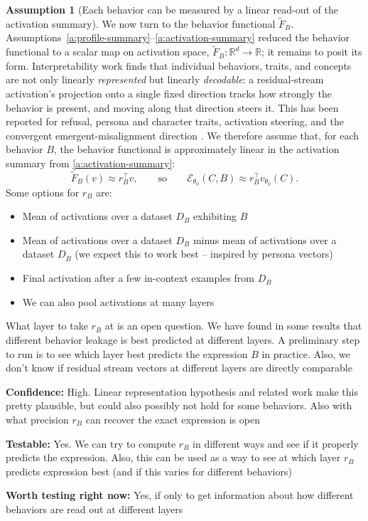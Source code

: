 \documentclass[11pt]{article}
\theoremstyle{definition}
\theoremstyle{definition}
\theoremstyle{assumptionstyle}
\newtheorem{assumption}{Assumption}[section]
\newcommand{\Expr}{\mathcal{E}}        %
\newcommand{\R}{\mathbb{R}}
\begin{document}
\begin{assumption}[Each behavior can be measured by a linear read-out of the activation summary]
\label{a:linear-readout}
We now turn to the behavior functional $\widetilde F_B$.
Assumptions~\ref{a:profile-summary}--\ref{a:activation-summary} reduced the
behavior functional to a scalar map on activation space,
\(\widetilde F_B:\R^d\to\R\); it remains to posit its form. Interpretability work
finds that individual behaviors, traits, and concepts are not only linearly
\emph{represented} but linearly \emph{decodable}: a residual-stream activation's
projection onto a single fixed direction tracks how strongly the behavior is
present, and moving along that direction steers it. This has been reported for
refusal, persona and character traits, activation steering,
and the convergent emergent-misalignment direction
\cite{arditi2024,chen2025,wang2025,turner2023,panickssery2023,zou2023,soligo2025,park2023}.
We therefore assume that, for each behavior \(B\), the behavior functional is approximately linear in the activation summary from \ref{a:activation-summary}:
\[
\widetilde F_B(v)
\approx
r_B^\top v,
\qquad\text{so}\qquad
\Expr_{\theta_0}(C,B)
\approx
r_B^\top v_{\theta_0}(C).
\]
Some options for $r_B$ are:
\begin{itemize}
    \item Mean of activations over a dataset $D_{B}$ exhibiting $B$
    \item Mean of activations over a dataset $D_{B}$ minus mean of activations over a dataset $D_{\bar{B}}$ (we expect this to work best -- inspired by persona vectors)
    \item Final activation after a few in-context examples from $D_B$
    \item We can also pool activations at many layers
\end{itemize}
What layer to take $r_B$ at is an open question. We have found in some results that different behavior leakage is best predicted at different layers. A preliminary step to run is to see which layer best predicts the expression $B$ in practice. Also, we don't know if residual stream vectors at different layers are directly comparable

\textbf{Confidence:} High. Linear representation hypothesis and related work make this pretty plausible, but could also possibly not hold for some behaviors. Also with what precision $r_B$ can recover the exact expression is open

\textbf{Testable:} Yes. We can try to compute $r_B$ in different ways and see if it properly predicts the expression. Also, this can be used as a way to  see at which layer $r_B$ predicts expression best (and if this varies for different behaviors)

\textbf{Worth testing right now:} Yes, if only to get information about how different behaviors are read out at different layers
\end{assumption}
\end{document}
